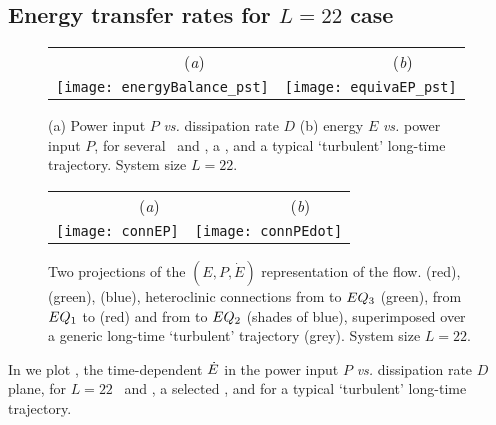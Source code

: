 \subsection{Energy transfer rates for $L=22$ case}
\label{sec:energyL22}

\begin{figure}[t]
\begin{center}
 \begin{tabular}{cc}
        ~~~~~~~~(\textit{a})                        &   ~~~~~~~~(\textit{b}) \\
    \texttt{[image: energyBalance\_pst]}
    & \texttt{[image: equivaEP\_pst]}

  \end{tabular}
\end{center}
\caption{
(a) Power input $P$ {\em vs.}
dissipation rate $D$
(b) energy $E$  {\em vs.}
power input $P$,   for several  \eqva\ and \reqva,
a \rpo, and a typical `turbulent' long-time trajectory.
System size $L=22$.
        }
\label{f:drivedrag1}
\end{figure}

\begin{figure}[t]
\begin{center}
 \begin{tabular}{cc}
        ~~~~~~~~(\textit{a})                        &   ~~~~~~~~(\textit{b}) \\
    \texttt{[image: connEP]}
     & \texttt{[image: connPEdot]}
 \end{tabular}
\end{center}
\caption{
Two projections of the $(E,P,\dot{E})$ representation of the flow.
 (red),  (green),  (blue),
heteroclinic connections from  to $EQ_{3}$ (green),
from $EQ_{1}$ to  (red)
and from  to $EQ_{2}$ (shades of blue), superimposed over
a generic long-time `turbulent' trajectory (grey).
System size $L=22$.
        }
\label{f:drivedragConn}
\end{figure}

                                                    \toCB
In  we plot , the time-dependent
$\dot{E}$ in the power input $P$ {\em vs.}
dissipation rate $D$ plane, for $L=22$ \eqva\ and \reqva,
a selected \rpo, and for a typical `turbulent' long-time
trajectory.

